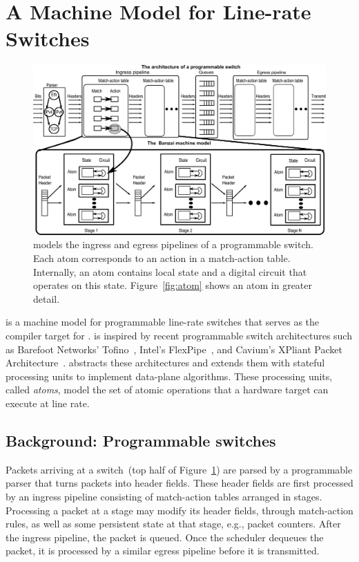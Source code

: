 \section{A Machine Model for Line-rate Switches}
\label{s:absmachine}
\begin{figure}[!t]
  \includegraphics[width=\textwidth]{banzai.pdf}
  \caption{\absmachine models the ingress and egress pipelines of a
  programmable switch. Each atom corresponds to an action in a match-action
  table. Internally, an atom contains local state and a digital circuit that
  operates on this state. Figure~\ref{fig:atom} shows an atom in greater detail.}
  \label{fig:switch}
\end{figure}

\absmachine is a machine model for programmable line-rate switches that serves
as the compiler target for \pktlanguage.  \absmachine is inspired by recent
programmable switch architectures such as Barefoot Networks' Tofino~\cite{tofino},
Intel's FlexPipe~\cite{flexpipe}, and Cavium's XPliant Packet
Architecture~\cite{xpliant}. \absmachine abstracts these architectures and
extends them with stateful processing units to implement data-plane algorithms.
These processing units, called {\em atoms}, model the set of atomic operations
that a hardware target can execute at line rate.

\subsection{Background: Programmable switches}
Packets arriving at a switch~(top half of Figure~\ref{fig:switch}) are parsed
by a programmable parser that turns packets into header fields. These header
fields are first processed by an ingress pipeline consisting of match-action
tables arranged in stages. Processing a packet at a stage may modify its header
fields, through match-action rules, as well as some persistent state at that
stage, e.g., packet counters. After the ingress pipeline, the packet is
queued. Once the scheduler dequeues the packet, it is processed by a
similar egress pipeline before it is transmitted.


